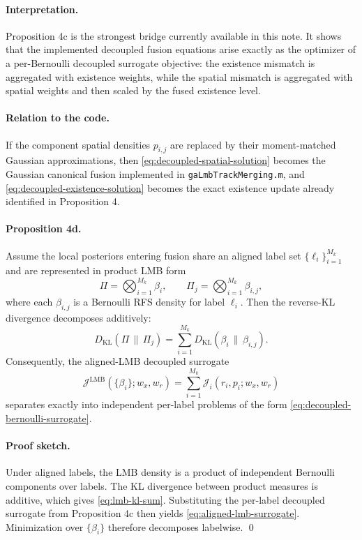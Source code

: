 \paragraph{Interpretation.}
Proposition 4c is the strongest bridge currently available in this note. It shows that the implemented decoupled fusion equations arise exactly as the optimizer of a per-Bernoulli decoupled surrogate objective: the existence mismatch is aggregated with existence weights, while the spatial mismatch is aggregated with spatial weights and then scaled by the fused existence level.

\paragraph{Relation to the code.}
If the component spatial densities $p_{i,j}$ are replaced by their moment-matched Gaussian approximations, then \eqref{eq:decoupled-spatial-solution} becomes the Gaussian canonical fusion implemented in \texttt{gaLmbTrackMerging.m}, and \eqref{eq:decoupled-existence-solution} becomes the exact existence update already identified in Proposition 4.

\paragraph{Proposition 4d.}
Assume the local posteriors entering fusion share an aligned label set $\{\ell_i\}_{i=1}^{M_k}$ and are represented in product LMB form
\begin{equation}
\Pi = \bigotimes_{i=1}^{M_k} \beta_i,
\qquad
\Pi_j = \bigotimes_{i=1}^{M_k} \beta_{i,j},
\end{equation}
where each $\beta_{i,j}$ is a Bernoulli RFS density for label $\ell_i$. Then the reverse-KL divergence decomposes additively:
\begin{equation}
D_{\mathrm{KL}}(\Pi \,\|\, \Pi_j)
=
\sum_{i=1}^{M_k} D_{\mathrm{KL}}(\beta_i \,\|\, \beta_{i,j}).
\label{eq:lmb-kl-sum}
\end{equation}
Consequently, the aligned-LMB decoupled surrogate
\begin{equation}
\mathcal{J}^{\mathrm{LMB}}(\{\beta_i\};w_x,w_r)
=
\sum_{i=1}^{M_k}
\mathcal{J}_i(r_i,p_i;w_x,w_r)
\label{eq:aligned-lmb-surrogate}
\end{equation}
separates exactly into independent per-label problems of the form \eqref{eq:decoupled-bernoulli-surrogate}.

\paragraph{Proof sketch.}
Under aligned labels, the LMB density is a product of independent Bernoulli components over labels. The KL divergence between product measures is additive, which gives \eqref{eq:lmb-kl-sum}. Substituting the per-label decoupled surrogate from Proposition 4c then yields \eqref{eq:aligned-lmb-surrogate}. Minimization over $\{\beta_i\}$ therefore decomposes labelwise. \qed

